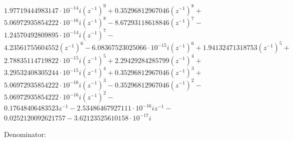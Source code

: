 \documentclass{scrartcl}
\begin{document}
\begin{center}
    $1.97719444983147 \cdot 10^{-14} i \left(z^{-1}\right)^{9} + 0.35296812967046 \left(z^{-1}\right)^{8} + $\\ 
    $5.06972935854222 \cdot 10^{-16} i \left(z^{-1}\right)^{8} - 8.67293118618846 \left(z^{-1}\right)^{7} - $\\ 
    $1.24570492809895 \cdot 10^{-14} i \left(z^{-1}\right)^{7} - $\\ 
    $4.23561755604552 \left(z^{-1}\right)^{6} - 6.08367523025066 \cdot 10^{-15} i \left(z^{-1}\right)^{6} + 1.94132471318753 \left(z^{-1}\right)^{5} + $\\
    $2.78835114719822 \cdot 10^{-15} i \left(z^{-1}\right)^{5} + 2.29429284285799 \left(z^{-1}\right)^{4} + $\\ 
    $3.29532408305244 \cdot 10^{-15} i \left(z^{-1}\right)^{4} + 0.35296812967046 \left(z^{-1}\right)^{3} + $\\ 
    $5.06972935854222 \cdot 10^{-16} i \left(z^{-1}\right)^{3} - 0.35296812967046 \left(z^{-1}\right)^{2} -$\\ 
    $ 5.06972935854222 \cdot 10^{-16} i \left(z^{-1}\right)^{2} - $\\ 
    $0.17648406483523 z^{-1} - 2.53486467927111 \cdot 10^{-16} i z^{-1} - $\\ 
    $0.0252120092621757 - 3.62123525610158 \cdot 10^{-17} i$
\end{center}


Denominator:
\end{document}
